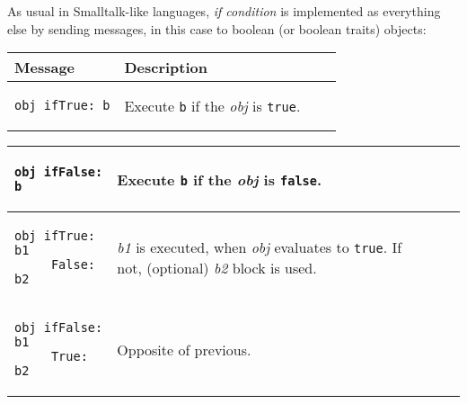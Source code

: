 \documentclass[10pt]{article}
\begin{document}
\begin{multicols*}{3}
As usual in Smalltalk-like languages, \textit{if condition} is implemented as everything else by sending messages, in this case to boolean (or boolean traits) objects:

\vspace*{0.2cm}

\small{\begin{tabular}{ p{70pt} p{140pt} l l }
Message & Description
\\ \hline %
\begin{lstlisting}
obj ifTrue: b
\end{lstlisting}
&\vspace*{0.25cm}
Execute \texttt{b} if the \textit{obj} is \texttt{true}.
\\\hline %
\end{tabular}}



\small{\begin{tabular}{ p{70pt} p{140pt} l l }

\\ \hline %
\begin{lstlisting}
obj ifFalse: b
\end{lstlisting}
&\vspace*{0.25cm}
Execute \texttt{b} if the \textit{obj} is \texttt{false}.
\\\hline %

\begin{lstlisting}
obj ifTrue: b1
     False: b2
\end{lstlisting}
&\vspace*{0.1cm}
\textit{b1} is executed, when \textit{obj} evaluates to \texttt{true}.
If not, (optional) \textit{b2} block is used.
\\\hline %

\begin{lstlisting}
obj ifFalse: b1
     True: b2
\end{lstlisting}
&\vspace*{0.4cm}
Opposite of previous.
\\\hline %
\end{tabular}}





\end{multicols*}
\end{document}
